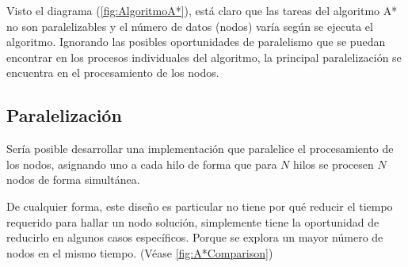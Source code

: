 Visto el diagrama (\ref{fig:AlgoritmoA*}),
está claro que las tareas del algoritmo A* no son paralelizables
y el número de datos (nodos) varía según se ejecuta el algoritmo.
Ignorando las posibles oportunidades de paralelismo que se puedan encontrar
en los procesos individuales del algoritmo,
la principal paralelización se encuentra en el
procesamiento de los nodos.

\subsection{Paralelización}

Sería posible desarrollar una implementación que paralelice el procesamiento de los nodos,
asignando uno a cada hilo de forma que para $N$ hilos se procesen $N$ nodos
de forma simultánea.

De cualquier forma, este diseño es particular no tiene por qué reducir el tiempo
requerido para hallar un nodo solución, simplemente tiene la oportunidad de reducirlo
en algunos casos específicos.
Porque se explora un mayor número de nodos en el mismo tiempo.
(Véase \ref{fig:A*Comparison})

